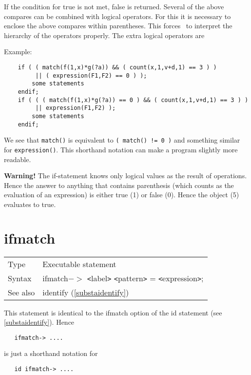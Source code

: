 If the condition for true is not met, false is returned. Several of the 
above compares can be combined with logical operators. For this it is 
necessary to enclose the above compares within parentheses. This forces 
\FORM\ to interpret the hierarchy of the operators 
properly. The extra logical operators are
 
\leftvitem{2cm}{$||$}
 
\leftvitem{2cm}{$\&\&$}

\noindent Example:
\begin{verbatim}
    if ( ( match(f(1,x)*g(?a)) && ( count(x,1,v+d,1) == 3 ) )
         || ( expression(F1,F2) == 0 ) );
        some statements
    endif;
    if ( ( ( match(f(1,x)*g(?a)) == 0 ) && ( count(x,1,v+d,1) == 3 ) )
         || expression(F1,F2) );
        some statements
    endif;
\end{verbatim}
We see that \verb:match(): is equivalent to \verb:( match() != 0 ): and 
something similar for \verb:expression():. This shorthand 
notation can make a program slightly more readable.

{\bf Warning! } The if-statement knows only logical values as the result of 
operations. Hence the answer to anything that contains parenthesis (which 
counts as the evaluation of an expression) is either true (1) or false (0). 
Hence the object (5) evaluates to true. \vspace{10mm}


\section{ifmatch}
\label{substaifmatch}

\noindent \begin{tabular}{ll}
Type & Executable statement\\
Syntax & ifmatch$-\!\!>$ {\tt<}label{\tt>} {\tt<}pattern{\tt>} = {\tt<}expression{\tt>};
\\ See also & identify (\ref{substaidentify})
\end{tabular} \vspace{4mm}

\noindent This statement is identical to the ifmatch option 
of the id statement (see \ref{substaidentify}). Hence
\begin{verbatim}
   ifmatch-> ....
\end{verbatim}
is just a shorthand notation for
\begin{verbatim}
   id ifmatch-> ....
\end{verbatim}
\vspace{10mm}

